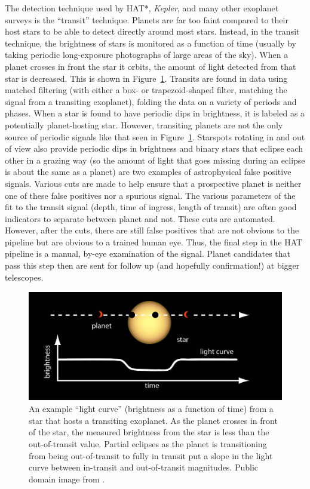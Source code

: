 The detection technique used by HAT*, {\it Kepler}, and many other exoplanet surveys is the ``transit'' technique.  Planets are far too faint compared to their host stars to be able to detect directly around most stars.  Instead, in the transit technique, the brightness of stars is monitored as a function of time (usually by taking periodic long-exposure photographs of large areas of the sky).  When a planet crosses in front the star it orbits, the amount of light detected from that star is decreased.  This is shown in Figure~\ref{transit}.  Transits are found in data using matched filtering (with either a box- or trapezoid-shaped filter, matching the signal from a transiting exoplanet), folding the data on a variety of periods and phases.  When a star is found to have periodic dips in brightness, it is labeled as a potentially planet-hosting star.  However, transiting planets are not the only source of periodic signals like that seen in Figure~\ref{transit}.  Starspots rotating in and out of view also provide periodic dips in brightness and binary stars that eclipse each other in a grazing way (so the amount of light that goes missing during an eclipse is about the same as a planet) are two examples of astrophysical false positive signals. Various cuts are made to help ensure that a prospective planet is neither one of these false positives nor a spurious signal.  The various parameters of the fit to the transit signal (depth, time of ingress, length of transit) are often good indicators to separate between planet and not.  These cuts are automated.  However, after the cuts, there are still false positives that are not obvious to the pipeline but are obvious to a trained human eye.  Thus, the final step in the HAT pipeline is a manual, by-eye examination of the signal.  Planet candidates that pass this step then are sent for follow up (and hopefully confirmation!) at bigger telescopes.

\begin{figure}
\begin{centering}
\includegraphics[height=1.9in]{transit.png}
\caption{\label{transit} An example ``light curve'' (brightness as a function of time) from a star that hosts a transiting exoplanet.  As the planet crosses in front of the star, the measured brightness from the star is less than the out-of-transit value.  Partial eclipses as the planet is transitioning from being out-of-transit to fully in transit put a slope in the light curve between in-transit and out-of-transit magnitudes.  Public domain image from \cite{transit_pic}.}
\end{centering}
\end{figure}

